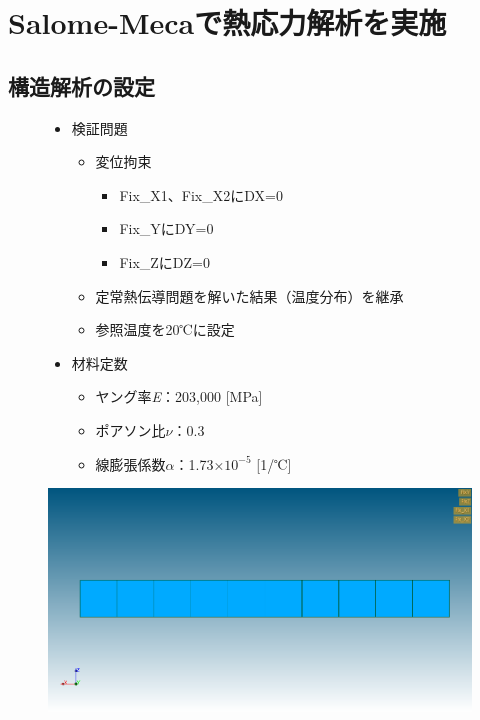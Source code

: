 \section{Salome-Mecaで熱応力解析を実施}
\subsection{構造解析の設定}
\vspace{-\baselineskip}
\begin{figure}[H]
	\begin{minipage}{0.59\hsize}
		\begin{itemize}
			\item 検証問題
			      \begin{itemize}
				      \item 変位拘束
				            \begin{itemize}
					            \item Fix\_X1、Fix\_X2にDX=0
					            \item Fix\_YにDY=0
					            \item Fix\_ZにDZ=0
				            \end{itemize}
				      \item 定常熱伝導問題を解いた結果（温度分布）を継承
				      \item 参照温度を20℃に設定
			      \end{itemize}
		\end{itemize}
	\end{minipage}
	\begin{minipage}{0.39\hsize}
		\begin{itemize}
			\item 材料定数
			      \begin{itemize}
				      \item ヤング率\textit{E}：203,000 [MPa]
				      \item ポアソン比$\nu$：0.3
				      \item 線膨張係数$\alpha$：1.73×$10^{-5}$ [1/℃]
			      \end{itemize}
		\end{itemize}
		\vspace{2\baselineskip}
	\end{minipage}
\end{figure}
\vspace{-\baselineskip}
\begin{figure}[H]
	\centering
	\includegraphics[width=0.6\columnwidth]{fig/settingS.png}
\end{figure}
\clearpage
